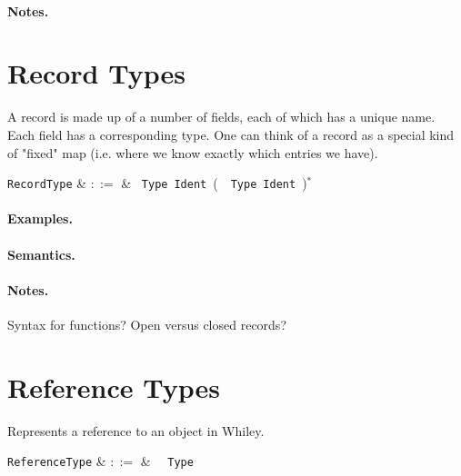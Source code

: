 \paragraph{Notes.}


\section{Record Types}

A record is made up of a number of fields, each of which has a unique name. Each field has a corresponding type. One can think of a record as a special kind of "fixed" map (i.e. where we know exactly which entries we have).

\begin{syntax}
  \verb+RecordType+ & $::=$ & \token{\{}\ \verb+Type+\
  \verb+Ident+\ \big(\ \token{,}\ \verb+Type+\ \verb+Ident+\
  \big)$^*$ \ \token{\}}\\
\end{syntax}

\paragraph{Examples.}

\paragraph{Semantics.}

\paragraph{Notes.}  Syntax for functions?  Open versus closed records?


\section{Reference Types}

Represents a reference to an object in Whiley.

\begin{syntax}
  \verb+ReferenceType+ & $::=$ & \token{\&}\ \ \verb+Type+\\
\end{syntax}

